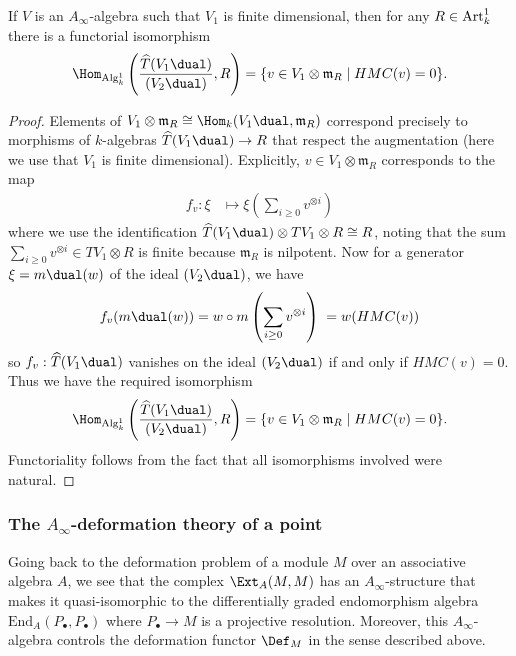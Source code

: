 \begin{lemma}\label{lemma-hmc-representable}
    If \(V\) is an \(A_\infty\)-algebra such that \(V_1\) is
    finite dimensional, then for any \(R\in \textnormal{Art}^1_k\) there is a
    functorial isomorphism 
    \[\Hom_{\textnormal{Alg}^1_k} \left(\frac{\widehat{T}(V_1\dual)}{(V_2\dual)},
    R\right) = \{v\in V_1\otimes \mathfrak{m}_R\;|\; HMC(v)=0\} .\] 
    \begin{proof} 
        Elements of \(V_1\otimes \mathfrak{m}_R\cong \Hom_k(V_1\dual,
        \mathfrak{m}_R)\) correspond precisely to morphisms of \(k\)-algebras
        \(\widehat{T}(V_1\dual)\rightarrow R\) that respect the augmentation
        (here we use that \(V_1\) is finite dimensional). Explicitly, \(v\in
        V_1\otimes \mathfrak{m}_R\) corresponds to the map 
        \begin{align*}
            f_v: \xi&\mapsto \xi\left(\sum_{i\geq 0}v^{\otimes i}\right)
        \end{align*}
        where we use the identification \(\widehat{T}(V_1\dual)\otimes
        TV_1\otimes R \cong R\), noting that the sum \(\sum_{i\geq 0} v^{\otimes i} \in
        TV_1\otimes R\) is finite because \(\mathfrak{m}_R\) is nilpotent. Now
        for a generator \(\xi=m\dual(w)\) of the ideal \((V_2\dual)\), we have 
        \begin{align*}
            f_v(m\dual(w)) = w\circ m \left(\sum_{i\geq 0}v^{\otimes i}\right)
            \;
                           = w(HMC(v))
        \end{align*}
        so \(f_v:\widehat{T}(V_1\dual)\) vanishes on the ideal \((V_2\dual)\) if
        and only if \(HMC(v)=0\). Thus we have the required isomorphism
        \[\Hom_{\text{Alg}^1_k} \left( \frac{\widehat{T}(V_1\dual)}{(V_2\dual)},
            R\right) = \{v\in V_1\otimes \mathfrak{m}_R\;|\; HMC(v)=0\}.\] 
        Functoriality follows from the fact that all isomorphisms involved were
        natural.
        \end{proof}
\end{lemma}

\subsubsection{The \(A_\infty\)-deformation theory of a point}
Going back to the deformation problem of a module \(M\) over an associative
algebra \(A\), we see that the complex \(\Ext_A(M,M)\) has an
\(A_\infty\)-structure that makes it quasi-isomorphic to the differentially
graded endomorphism algebra \(\text{End}_A(P_\bullet,P_\bullet)\) where
\(P_\bullet\rightarrow M\) is a projective resolution. Moreover, this
\(A_\infty\)-algebra controls the deformation functor \(\Def_M\) in the sense
described above.

